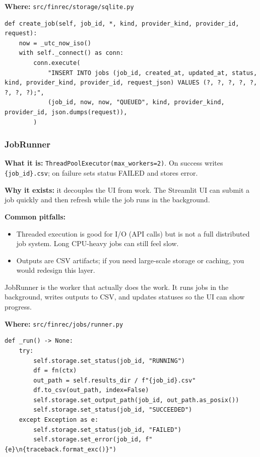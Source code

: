 \documentclass[11pt,a4paper]{article}
\begin{document}
\textbf{Where:} \texttt{src/finrec/storage/sqlite.py}

\begin{lstlisting}
def create_job(self, job_id, *, kind, provider_kind, provider_id, request):
    now = _utc_now_iso()
    with self._connect() as conn:
        conn.execute(
            "INSERT INTO jobs (job_id, created_at, updated_at, status, kind, provider_kind, provider_id, request_json) VALUES (?, ?, ?, ?, ?, ?, ?, ?);",
            (job_id, now, now, "QUEUED", kind, provider_kind, provider_id, json.dumps(request)),
        )
\end{lstlisting}

\subsubsection{JobRunner}\label{sec:job-runner}

\textbf{What it is:} \texttt{ThreadPoolExecutor(max\_workers=2)}. On success writes \texttt{\{job\_id\}.csv}; on failure sets status FAILED and stores error.

\textbf{Why it exists:} it decouples the UI from work. The Streamlit UI can submit a job quickly and then refresh while the job runs in the background.

\textbf{Common pitfalls:}
\begin{itemize}[leftmargin=2em]
  \item Threaded execution is good for I/O (API calls) but is not a full distributed job system. Long CPU-heavy jobs can still feel slow.
  \item Outputs are CSV artifacts; if you need large-scale storage or caching, you would redesign this layer.
\end{itemize}

\begin{intuitionbox}
JobRunner is the worker that actually does the work. It runs jobs in the background, writes outputs to CSV, and updates statuses so the UI can show progress.
\end{intuitionbox}

\textbf{Where:} \texttt{src/finrec/jobs/runner.py}

\begin{lstlisting}
def _run() -> None:
    try:
        self.storage.set_status(job_id, "RUNNING")
        df = fn(ctx)
        out_path = self.results_dir / f"{job_id}.csv"
        df.to_csv(out_path, index=False)
        self.storage.set_output_path(job_id, out_path.as_posix())
        self.storage.set_status(job_id, "SUCCEEDED")
    except Exception as e:
        self.storage.set_status(job_id, "FAILED")
        self.storage.set_error(job_id, f"{e}\n{traceback.format_exc()}")
\end{lstlisting}
\end{document}
